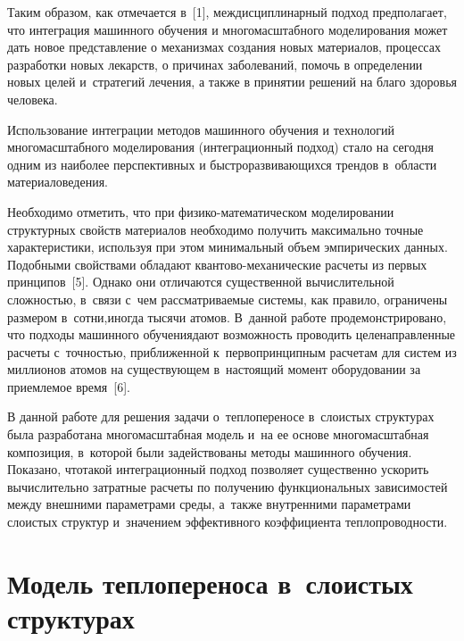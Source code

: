 \begin{multicols}{2}
    Таким образом, как отмечается в~[1], меж\-дис\-цип\-ли\-нар\-ный подход 
предполагает, что интеграция машинного обучения и многомасштабного 
моделирования может дать новое представление о механизмах создания новых 
материалов, процессах разработки новых лекарств, о причинах заболеваний, 
помочь в определении новых целей и~стратегий лечения, а также в принятии 
решений на благо здоровья человека. 
    
    Использование интеграции методов машинного обучения и технологий 
многомасштабного моделирования (интеграционный подход) стало на сегодня 
одним из наиболее перспективных и быстроразвивающихся трендов в~области 
материаловедения. 
    
    Необходимо отметить, что при физико-ма\-те\-ма\-ти\-че\-ском моделировании 
структурных свойств материалов необходимо получить максимально точные 
характеристики, используя при этом \mbox{минимальный} объем эмпирических данных. 
Подобными свойствами обладают кван\-то\-во-ме\-ха\-ни\-че\-ские расчеты из 
первых принципов~[5]. Однако они отличаются существенной вычислительной 
сложностью, в~связи с~чем рассматриваемые сис\-те\-мы, как правило, ограничены 
размером в~сотни,\linebreak иногда тысячи атомов. В~данной работе 
продемонстрировано, что подходы машинного обучения\linebreak дают возможность 
проводить целенаправленные расчеты с~точ\-ностью, приближенной 
к~первопринципным расчетам для систем из миллионов атомов на существующем 
в~настоящий момент оборудовании за приемлемое время~[6].
    
    В данной работе для решения задачи о~теплопереносе в~слоистых 
структурах была разработана многомасштабная модель и~на ее основе 
многомасштабная композиция, в~которой были задействованы методы 
машинного обучения. Показано, что\linebreak такой интеграционный подход позволяет 
существенно ускорить вычислительно затратные расчеты по получению 
функциональных зависимостей между внеш\-ни\-ми па\-ра\-мет\-ра\-ми среды, а~так\-же 
внут\-рен\-ни\-ми параметрами сло\-истых структур и~значением эффективного 
коэффициента теп\-ло\-про\-вод\-ности.


\section{Модель теплопереноса в~слоистых структурах}


\end{multicols}
